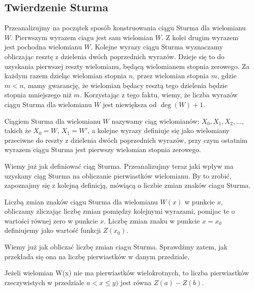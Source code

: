 \subsection{Twierdzenie Sturma}

Przeanalizujmy na początek sposób konstruowania ciągu Sturma dla wielomianu $W$. Pierwszym wyrazem ciagu jest sam wielomian $W$. Z kolei drugim wyrazem jest pochodna wielomianu $W$. Kolejne wyrazy ciągu Sturma wyznaczamy obliczając resztę z dzielenia dwóch poprzednich wyrazów. Dzieje się to do uzyskania pierwszej reszty wielomianu, będącą wielomianem stopnia zerowego. Za każdym razem dzieląc wielomian stopnia $n$, przez wielomian stopnia $m$, gdzie $m<n$, mamy gwarancję, że wielomian będacy resztą tego dzielenia będzie stopnia mniejszego niż $m$. Korzystając z tego faktu, wiemy, że liczba wyrazów ciągu Sturma dla wielomianu $W$ jest niewiększa od $\deg(W)+1$.

\begin{definition}
	$ $ \\
	Ciągiem Sturma dla wielomianu $W$ nazywamy ciąg wielomianów: $X_0, X_1, X_2,...$, takich że $X_0=W$, $X_1=W'$, a kolejne wyrazy definiuje się jako wielomiany przeciwne do reszty z dzielenia dwóch poprzednich wyrazów, przy czym ostatnim wyrazem ciągu Sturma jest pierwszy wielomian stopnia zerowego. 
\end{definition}

Wiemy już jak definiować ciąg Sturma. Przeanalizujmy teraz jaki wpływ ma uzyskany ciąg Sturma na obliczanie pierwiastków wielomianu. By to zrobić, zapoznajmy się z kolejną definicją, mówiącą o liczbie zmian znaków ciagu Sturma.

\begin{definition}
	$ $ \\
	Liczbą zmian znaków ciągu Sturma dla wielomianu $W(x)$ w punkcie $x$, obliczamy zliczając liczbę zmian pomiędzy kolejnymi wyrazami, pomijac te o wartości równej zero w punkcie $x$. Liczbę zmian znaku w punkcie $x=x_0$ definiujemy jako wartość funkcji $Z(x_0)$.
\end{definition}

Wiemy już jak obliczać liczbę zmian ciagu Sturma. Sprawdźmy zatem, jak przekłada się ona na liczbę pierwiastków w danym przedziale.

\begin{theorem}
	$ $ \\
	Jeżeli wielomian W(x) nie ma pierwiastków wielokrotnych, to liczba pierwiastków rzeczywistych w przedziale $a<x\le y)$ jest równa $Z(a) - Z(b)$.
\end{theorem}

